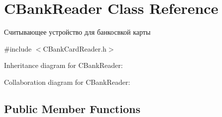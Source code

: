 \hypertarget{classCBankReader}{}\section{C\+Bank\+Reader Class Reference}
\label{classCBankReader}


Считывающее устройство для банкосвкой карты  




{\ttfamily \#include $<$C\+Bank\+Card\+Reader.\+h$>$}



Inheritance diagram for C\+Bank\+Reader\+:


Collaboration diagram for C\+Bank\+Reader\+:
\subsection*{Public Member Functions}
